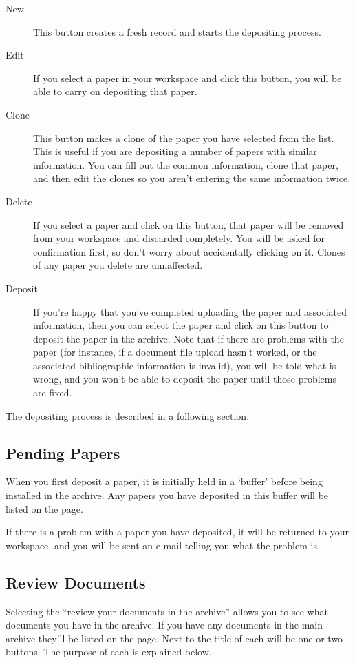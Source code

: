 \begin{description}
\item[New] This button creates a fresh record and starts the depositing process.
\item[Edit] If you select a paper in your workspace and click this button, you will be able to carry on depositing that paper.
\item[Clone] This button makes a clone of the paper you have selected from the list. This is useful if you are depositing a number of papers with similar information. You can fill out the common information, clone that paper, and then edit the clones so you aren't entering the same information twice.
\item[Delete] If you select a paper and click on this button, that paper will be removed from your workspace and discarded completely. You will be asked for confirmation first, so don't worry about accidentally clicking on it. Clones of any paper you delete are unnaffected.
\item[Deposit] If you're happy that you've completed uploading the paper and associated information, then you can select the paper and click on this button to deposit the paper in the archive. Note that if there are problems with the paper (for instance, if a document file upload hasn't worked, or the associated bibliographic information is invalid), you will be told what is wrong, and you won't be able to deposit the paper until those problems are fixed.
\end{description}

The depositing process is described in a following section.


\subsection{Pending Papers}

When you first deposit a paper, it is initially held in a `buffer' before being installed in the archive. Any papers you have deposited in this buffer will be listed on the page.

If there is a problem with a paper you have deposited, it will be returned to your workspace, and you will be sent an e-mail telling you what the problem is.


\subsection{Review Documents}

Selecting the ``review your documents in the archive'' allows you to see what documents you have in the archive. If you have any documents in the main archive they'll be listed on the page. Next to the title of each will be one or two buttons. The purpose of each is explained below.

